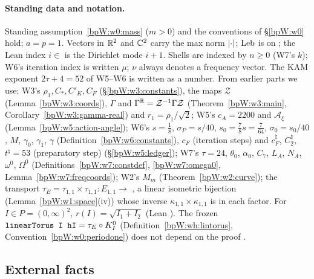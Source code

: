 \paragraph{Standing data and notation.} Standing assumption~\ref{bpW:w0:mass} ($m>0$) and the conventions of
\S\ref{bpW:w0} hold; $a=p=1$. Vectors in $\mathbb{R}^2$ and $\mathbb{C}^2$ carry the max norm $\lvert \cdot\rvert$; $\operatorname{Leb}$ is 
on ; the Lean index $i\in$  is the Dirichlet mode $i+1$. Shells are indexed by
$n\ge0$ (W7's $k$); W6's iteration index is written $\mu$; $\nu$ always denotes a frequency vector. The KAM exponent
$2\tau+4=52$ of W5--W6 is written as a number. From earlier parts we use: W3's $\rho_1,C_*,C'_K,C_F$
(\S\ref{bpW:w3:constants}), the maps $\mathcal Z$ (Lemma~\ref{bpW:w3:coords}), $\Gamma$ and
$\Gamma^{\mathbb{R}}=\mathcal Z^{-1}\Gamma\mathcal Z$ (Theorem~\ref{bpW:w3:main}, Corollary~\ref{bpW:w3:gamma-real}) and
$r_1=\rho_1/\sqrt2$; W5's $c_A=2200$ and $\mathcal A_\xi$ (Lemma~\ref{bpW:w5:action-angle}); W6's $s=\frac18$,
$\sigma_P=s/40$, $s_0=\frac78s=\frac7{64}$, $\sigma_0=s_0/40$, $M$, $\gamma_0$, $\gamma_1$, $\gamma$
(Definition~\ref{bpW:w6:constants}), $c_F$ (iteration steps) and $c^\natural_F$, $C^\natural_2$, $t^\natural=53$ (preparatory step)
(\S\ref{bpW:w5:ledger}); W7's $\tau=24$, $\theta_0$, $\alpha_0$,
$C_7$, $L_A$, $N_A$, $\omega^0$, $\Omega^0$ (Definitions~\ref{bpW:w7:constdef}, \ref{bpW:w7:omega0},
Lemma~\ref{bpW:w7:freqcoords}); W2's $M_m$ (Theorem~\ref{bpW:w2:curve}); the transport
$\tau_E=\tau_{1,1}\times\tau_{1,1}:E_{1,1}\to$ , a linear isometric bijection
(Lemma~\ref{bpW:w1:space}(iv)) whose inverse $\kappa_{1,1}\times\kappa_{1,1}$ is  in each factor. For
$I\in P=(0,\infty)^2$, $r(I)=\sqrt{I_1+I_2}$ (Lean ). The frozen
$\texttt{linearTorus I hI}=\tau_E\circ K^0_I$ (Definition~\ref{bpW:wh:lintorus}, Convention~\ref{bpW:w0:periodone}) does
not depend on the proof .

\subsection{External facts}\label{bpW:w8:ext}

